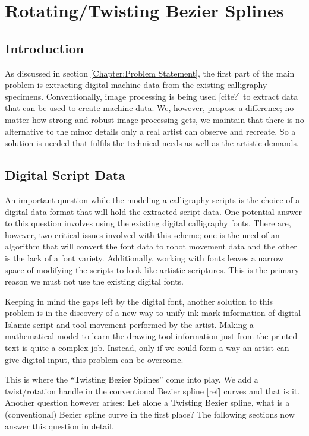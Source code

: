 \section{Rotating/Twisting Bezier Splines}\label{Chapter:Twisting Splines}

    \subsection{Introduction}
    As discussed in section \ref{Chapter:Problem Statement}, the first part of the main problem is extracting digital machine data from the existing calligraphy specimens.  Conventionally, image processing is being used [cite?] to extract data that can be used to create machine data. We, however, propose a difference; no matter how strong and robust image processing gets, we maintain that there is no alternative to the minor details only a real artist can observe and recreate. So a solution is needed that fulfils the technical needs as well as the artistic demands.


    \subsection{Digital Script Data}

    An important question while the modeling a calligraphy scripts is the choice of a digital data format that will hold the extracted script data. One potential answer to this question involves using the existing digital calligraphy fonts. There are, however, two critical issues involved with this scheme; one is the need of an algorithm that will convert the font data to robot movement data and the other is the lack of a font variety. Additionally, working with fonts leaves a narrow space of modifying the scripts to look like artistic scriptures. This is the primary reason we must not use the existing digital fonts.

    Keeping in mind the gaps left by the digital font, another solution to this problem is in the discovery of a new way to unify ink-mark information of digital Islamic script and tool movement performed by the artist. Making a mathematical model to learn the drawing tool information just from the printed text is quite a complex job. Instead, only if we could form a way an artist can give digital input, this problem can be overcome.

    This is where the ``Twisting Bezier Splines'' come into play. We add a twist/rotation handle in the conventional Bezier spline [ref] curves and that is it. Another question however arises: Let alone a Twisting Bezier spline, what is a (conventional) Bezier spline curve in the first place? The following sections now answer this question in detail.

